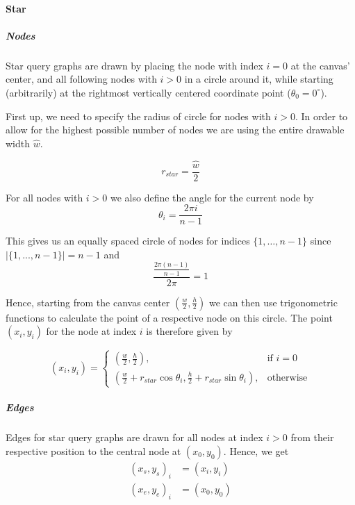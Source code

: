 \paragraph{Star} 

\subparagraph{Nodes} Star query graphs are drawn by placing the node with index $i = 0$ at the canvas' center, and all following nodes with $i > 0$ in a circle around it, while starting (arbitrarily) at the rightmost vertically centered coordinate point ($\theta_0 = 0^{\circ}$).

First up, we need to specify the radius of circle for nodes with $i > 0$. In order to allow for the highest possible number of nodes we are using the entire drawable width $\hat{w}$.

\begin{equation}\label{eqn:painting-r_star}
    r_{star} = \frac{\hat{w}}{2}
\end{equation}

For all nodes with $i > 0$ we also define the angle for the current node by
\begin{equation}\label{eqn:painting-theta}
    \theta_i = \frac{2\pi i}{n - 1}
\end{equation}

This gives us an equally spaced circle of nodes for indices $\{1,\dots,n-1\}$ since $\vert\{1,...,n-1\}\vert = n-1$ and
\begin{equation}
    \frac{\frac{2\pi(n-1)}{n-1}}{2\pi} = 1   
\end{equation}

Hence, starting from the canvas center $(\frac{w}{2}, \frac{h}{2})$ we can then use trigonometric functions to calculate the point of a respective node on this circle.
The point $(x_i, y_i)$ for the node at index $i$ is therefore given by

\begin{equation}
    (x_i, y_i) = 
    \begin{cases}
        (\frac{w}{2}, \frac{h}{2}),& \text{if } i = 0\\
        (\frac{w}{2} + r_{star}\cos{\theta_i}, \frac{h}{2} + r_{star}\sin{\theta_i}), & \text{otherwise}
    \end{cases}
\end{equation}

\subparagraph{Edges}
Edges for star query graphs are drawn for all nodes at index $i > 0$ from their respective position to the central node at $(x_0, y_0)$. Hence, we get 
\begin{equation}
    \begin{aligned}
        (x_s, y_s)_i &= (x_i, y_i)\\   
        (x_e, y_e)_i &= (x_{0}, y_{0})
    \end{aligned}
\end{equation}

